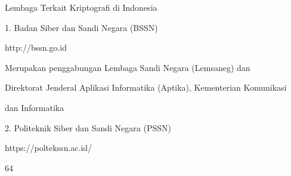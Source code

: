 \documentclass{article}
\begin{document}

Lembaga Terkait Kriptografi di Indonesia

1.  Badan Siber dan Sandi Negara (BSSN) 

        http://bssn.go.id

         Merupakan penggabungan Lembaga Sandi Negara (Lemsaneg) dan 

         Direktorat Jenderal Aplikasi Informatika   (Aptika),  Kementerian Komunikasi

         dan Informatika

2.  Politeknik Siber dan Sandi Negara (PSSN)

          https://poltekssn.ac.id/   


64
\end{document}
